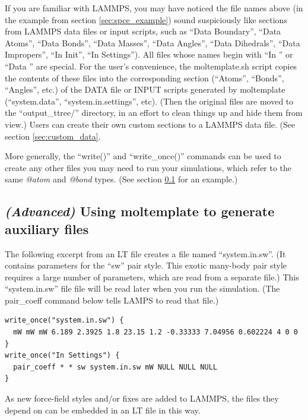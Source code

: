 \documentclass[11pt]{article}
\begin{document}
If you are familiar with LAMMPS, 
you may have noticed the file names above
(in the example from section \ref{sec:spce_example})
sound suspiciously like sections from LAMMPS data files or input scripts, 
such as ``Data Boundary'', ``Data Atoms'', ``Data Bonds'', ``Data Masses'', ``Data Angles'', ``Data Dihedrals'', ``Data Impropers'', ``In Init'', ``In Settings'').
All files whose names begin with ``In '' or ``Data '' are special.
For the user's convenience, 
the moltemplate.sh script copies the contents 
of these files into the corresponding section 
(``Atoms'', ``Bonds'', ``Angles'', etc.)
of the 
DATA file or INPUT scripts generated by moltemplate 
(``system.data'', ``system.in.settings'', etc).
(Then the original files are moved to the ``output\_ttree/'' directory, 
 in an effort to clean things up and hide them from view.)
Users can create their own custom sections to a LAMMPS data file.
(See section \ref{sec:custom_data}.

More generally, the ``write()'' and ``write\_once()'' commands can be used to
create any other files you may need to run your simulations,
which refer to the same \textit{@atom} and \textit{@bond} types.
(See section \ref{sec:aux_files} 
for an example.)


\subsection{\textit{(Advanced)} 
               Using moltemplate to generate auxiliary files}
\label{sec:aux_files}
The following excerpt from an LT file 
creates a file named ``system.in.sw''. 
(It contains parameters for the ``sw'' pair style.
 This exotic many-body pair style requires a large number
 of parameters, which are read from a separate file.)
This ``system.in.sw'' file file will be read later when you run the simulation.
(The pair\_coeff command below tells LAMPS to read that file.)
\begin{verbatim}
write_once("system.in.sw") {
  mW mW mW 6.189 2.3925 1.8 23.15 1.2 -0.33333 7.04956 0.602224 4 0 0
}
write_once("In Settings") {
  pair_coeff * * sw system.in.sw mW NULL NULL NULL
}
\end{verbatim}
As new force-field styles and/or fixes are added to LAMMPS, 
the files they depend on can be embedded in an LT file in this way. 
\end{document}
